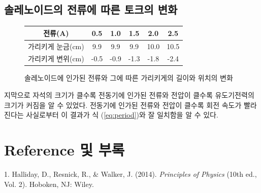 \documentclass[a4paper]{article}
\begin{document}
		\subsection{솔레노이드의 전류에 따른 토크의 변화}
		\begin{figure}[h]
			\centering
				\begin{tabular}{cccccc} 
					\hline \hline
					전류(A) \qquad \qquad \vline & 0.5 & 1.0 & 1.5 & 2.0 & 2.5 \\
					\hline
					가리키게 눈금(\si{cm}) \vline & 9.9 & 9.9 & 9.9 & 10.0 & 10.5 \\
					\hline
					가리키게 변위(\si{cm}) \vline & -0.5 & -0.9 & -1.3 & -1.8 & -2.4 \\
					\hline \hline
				\end{tabular}  \vspace{-0.2cm} \caption{솔레노이드에 인가된 전류와 그에 따른 가리키게의 길이와 위치의 변화}
			\vspace{-0.5cm}
			\label{tb:soloutput}
		\end{figure}
\newpage

	지막으로 자석의 크기가 클수록 전동기에 인가된 전류와 전압이 클수록 유도기전력의 크기가 커짐을 알 수 있었다. 전동기에 인가된 전류와 전압이 클수록 회전 속도가 빨라진다는 사실로부터 이 결과가 식 (\ref{eq:period})와 잘 일치함을 알 수 있다.



\section{Reference 및 부록}
	1. Halliday, D., Resnick, R., \& Walker, J. (2014). {\it{}Principles of Physics} (10th ed., Vol. 2). Hoboken, NJ: Wiley.
	\\ 
\end{document}
